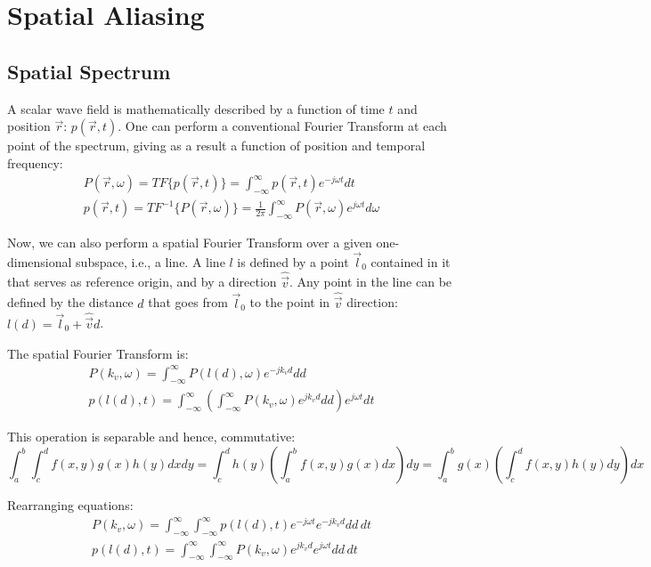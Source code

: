 \chapter{Spatial Aliasing}

\cite{Start1997}

\section{Spatial Spectrum}
A scalar wave field is mathematically described by a function of time $t$ and position $\vec{r}$: $p(\vec{r}, t)$. One can perform a conventional Fourier Transform at each point of the spectrum, giving as a result a function of position and temporal frequency:
\begin{gather}
P(\vec{r}, \omega) = TF\{p(\vec{r}, t)\} = \int_{-\infty}^{\infty} p(\vec{r}, t) e^{-j \omega t} dt \\
p(\vec{r}, t) = TF^{-1}\{P(\vec{r}, \omega)\} = \frac{1}{2\pi} \int_{-\infty}^{\infty} P(\vec{r}, \omega) e^{j \omega t} d\omega
\end{gather}

Now, we can also perform a spatial Fourier Transform over a given one-dimensional subspace, i.e., a line. A line $l$ is defined by a point $\vec{l}_0$ contained in it that serves as reference origin, and by a direction $\hat{\vec{v}}$. Any point in the line can be defined by the distance $d$ that goes from $\vec{l}_0$ to the point in $\hat{\vec{v}}$ direction: $l(d) = \vec{l}_0 + \hat{\vec{v}} d$.

The spatial Fourier Transform is:
\begin{gather}
	P(k_v, \omega) = \int_{-\infty}^{\infty} P(l(d), \omega) e^{-j k_v d} dd \\
	p(l(d), t) = \int_{-\infty}^{\infty} \left( \int_{-\infty}^{\infty} P(k_v, \omega) e^{j k_v d} dd \right) e^{j \omega t} dt
\end{gather}

This operation is separable and hence, commutative:
\begin{equation}
\int_{a}^{b} \int_{c}^{d} f(x, y) g(x) h(y) dx dy = \int_{c}^{d} h(y) \left(\int_{a}^{b} f(x, y) g(x) dx\right) dy = \int_{a}^{b} g(x) \left(\int_{c}^{d} f(x, y) h(y) dy\right) dx
\end{equation}

Rearranging equations:
\begin{gather}
P(k_v, \omega) = \int_{-\infty}^{\infty} \int_{-\infty}^{\infty} p(l(d), t) e^{-j \omega t} e^{-j k_v d} dd \, dt \\
p(l(d), t) = \int_{-\infty}^{\infty} \int_{-\infty}^{\infty} P(k_v, \omega) e^{j k_v d} e^{j \omega t} dd \, dt
\end{gather}

